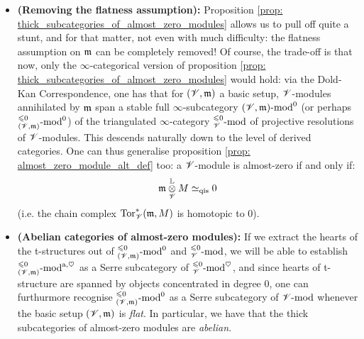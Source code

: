                 \begin{remark} \label{remark: almost_zero_modules_over_non_flat_basic_setups}
                    \noindent
                    \begin{itemize}
                        \item \textbf{(Removing the flatness assumption):} Proposition \ref{prop: thick_subcategories_of_almost_zero_modules} allows us to pull off quite a stunt, and for that matter, not even with much difficulty: the flatness assumption on $\mathfrak{m}$ can be completely removed! Of course, the trade-off is that now, only the $\infty$-categorical version of proposition \ref{prop: thick_subcategories_of_almost_zero_modules} would hold: via the Dold-Kan Correspondence, one has that for $(\mathscr{V}, \mathfrak{m})$ a basic setup, $\mathscr{V}$-modules annihilated by $\mathfrak{m}$ span a stable full $\infty$-subcategory $(\mathscr{V}, \mathfrak{m})\text{-}\mathrm{mod}^0$ (or perhaps ${}^{\leqslant 0}_{(\mathscr{V}, \mathfrak{m})}\text{-}\mathrm{mod}^0$) of the triangulated $\infty$-category ${}^{\leqslant 0}_{\mathscr{V}}\text{-}\mathrm{mod}$ of projective resolutions of $\mathscr{V}$-modules. This descends naturally down to the level of derived categories. One can thus generalise proposition \ref{prop: almost_zero_module_alt_def} too: a $\mathscr{V}$-module is almost-zero if and only if:
                            $$\m \tensor_{\scrV}^{\L} M \cong_{\qis} 0$$
                        (i.e. the chain complex $\mathrm{Tor}_{\mathscr{V}}^*(\mathfrak{m}, M)$ is homotopic to $0$).
                        \item \textbf{(Abelian categories of almost-zero modules):} If we extract the hearts of the t-structures out of ${}^{\leqslant 0}_{(\mathscr{V}, \mathfrak{m})}\text{-}\mathrm{mod}^0$ and ${}^{\leqslant 0}_{\mathscr{V}}\text{-}\mathrm{mod}$, we will be able to establish ${}^{\leqslant 0}_{(\mathscr{V}, \mathfrak{m})}\text{-}\mathrm{mod}^{\mathrm{a}, \heartsuit}$ as a Serre subcategory of ${}^{\leqslant 0}_{\mathscr{V}}\text{-}\mathrm{mod}^{\heartsuit}$, and since hearts of t-structure are spanned by objects concentrated in degree $0$, one can furthurmore recognise ${}^{\leqslant 0}_{(\mathscr{V}, \mathfrak{m})}\text{-}\mathrm{mod}^0$ as a Serre subcategory of $\mathscr{V}\text{-}\mathrm{mod}$ whenever the basic setup $(\mathscr{V}, \mathfrak{m})$ is \textit{flat}. In particular, we have that the thick subcategories of almost-zero modules are \textit{abelian}.
                    \end{itemize}
                \end{remark}
                
